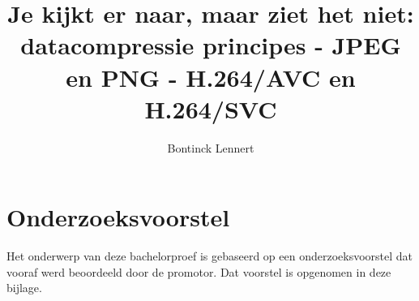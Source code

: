 \documentclass{bachproef-tin}
\title{Je kijkt er naar, maar ziet het niet: datacompressie	principes - JPEG en PNG - H.264/AVC en H.264/SVC}
\author{Bontinck Lennert}
\begin{document}


\inserttitlepage

\usechapterimagefalse



\pagestyle{empty} %
\tableofcontents  %
\cleardoublepage  %
\pagestyle{fancy} %
















\appendix
\renewcommand{\chaptername}{Appendix}


\chapter{Onderzoeksvoorstel}

Het onderwerp van deze bachelorproef is gebaseerd op een onderzoeksvoorstel dat vooraf werd beoordeeld door de promotor. Dat voorstel is opgenomen in deze bijlage.



%


\nocite{*}
\printbibliography[heading=bibintoc]
\end{document}
